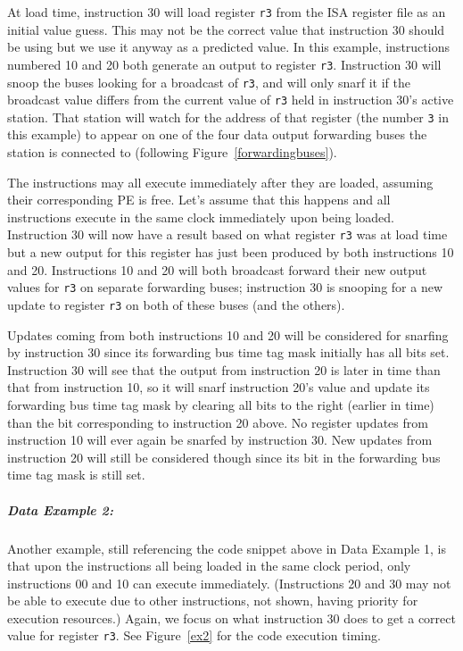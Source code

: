 \documentclass[10pt,dvips]{article}
\begin{document}
At load time, instruction 30 will
load register
{\tt r3}
from the ISA register file as an initial value guess.  
This may not be
the correct value that instruction 30 should be using but 
we use it anyway as a predicted value.
In this example, instructions numbered 10 and 20 both generate
an output to register 
{\tt r3}.
Instruction 30 will snoop the buses looking for a broadcast of
{\tt r3}, and will only snarf it if the broadcast value differs from
the current value of {\tt r3} held in instruction 30's active
station.
That station will watch for the address
of that register (the number {\tt 3} in this example) to
appear on one of the four data output forwarding buses the station is
connected to (following Figure~\ref{forwardingbuses}).

The instructions may all execute immediately after they are loaded,
assuming their corresponding PE is free.  Let's assume that this happens
and all instructions execute in the same clock immediately upon being
loaded.
Instruction 30 will now have a result based on what register
{\tt r3}
was at load time but a new output for this
register has just been produced by both instructions 10 and 20.
Instructions 10 and 20 will both broadcast forward their new output
values for
{\tt r3}
on separate forwarding buses; instruction
30 is snooping for a new update
to register
{\tt r3}
on both of these buses (and the others).

Updates coming from both instructions
10 and 20 will be considered for snarfing by instruction 30 since
its forwarding bus time tag mask initially has all bits set.
Instruction 30
will see that the output from instruction 20 is later
in time than that from instruction 10, so it will snarf instruction
20's value
and update its forwarding bus time tag mask by clearing all bits
to the right (earlier in time) than the bit corresponding to
instruction 20 above.  No register updates from instruction 10
will ever again be snarfed by instruction 30.  New updates
from instruction 20 will still be considered though since its
bit in the forwarding bus time tag mask is still set.

\subparagraph{Data Example 2: }
Another example, still referencing the code snippet above
in Data Example 1,
is that upon the instructions all being loaded in the same
clock period, only instructions 00 and 10 can execute immediately.
(Instructions 20 and 30 may not be able to execute due to
other instructions, not shown, having priority for execution
resources.)
Again, we focus on what instruction 30 does to get a correct
value for register
{\tt r3}. See Figure~\ref{ex2} for the code execution timing.
\end{document}

